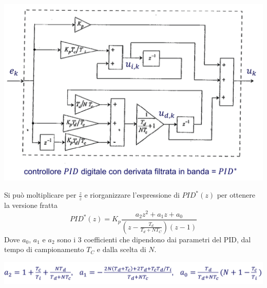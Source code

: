 \documentclass[10pt, letterpaper]{report}
\begin{document}
\begin{center}
    \includegraphics[width=1\textwidth]{images/schemaPIDdigitaleBanda.pdf.png}
\end{center}
Si può moltiplicare per $\frac{z}{z}$ e riorganizzare l'espressione di $PID^*(z)$ per ottenere la versione fratta 
$$
PID^*(z)=K_p\frac{a_2z^2+a_1z+a_0}{
    (z-\frac{T_d}{T_d+NT_C})(z-1)
}
$$
Dove $a_0$, $a_1$ e $a_2$ sono i 3 coefficienti che dipendono dai parametri del PID, dal tempo di campionamento $T_C$ e dalla scelta di $N$.
\begin{center}
    \includegraphics[width=1\textwidth]{images/coefficientiPID.png}
\end{center}
\end{document}
